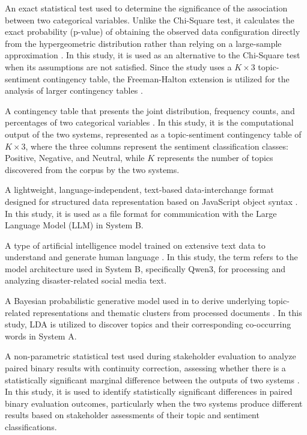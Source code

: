 \begin{description}[style=sameline,leftmargin=0pt]
	\item[Fisher's Exact Test.] An exact statistical test used to determine the significance of the association between two categorical variables. Unlike the Chi-Square test, it calculates the exact probability (p-value) of obtaining the observed data configuration directly from the hypergeometric distribution rather than relying on a large-sample approximation \parencite{mays2026use}. In this study, it is used as an alternative to the Chi-Square test when its assumptions are not satisfied. Since the study uses a \(K \times 3\) topic-sentiment contingency table, the Freeman-Halton extension is utilized for the analysis of larger contingency tables \parencite{metricgate2026freeman}.

	\item[Joint Matrix.] A contingency table that presents the joint distribution, frequency counts, and percentages of two categorical variables \parencite{ncssnd}. In this study, it is the computational output of the two systems, represented as a topic-sentiment contingency table of \(K \times 3\), where the three columns represent the sentiment classification classes: Positive, Negative, and Neutral, while \(K\) represents the number of topics discovered from the corpus by the two systems.

	\item[JSON (JavaScript Object Notation).] A lightweight, language-independent, text-based data-interchange format designed for structured data representation based on JavaScript object syntax \parencite{json2026introducing}. In this study, it is used as a file format for communication with the Large Language Model (LLM) in System B.

	\item[Large Language Model (LLM).] A type of artificial intelligence model trained on extensive text data to understand and generate human language \parencite{stryker2021large}. In this study, the term refers to the model architecture used in System B, specifically Qwen3, for processing and analyzing disaster-related social media text.

	\item[Latent Dirichlet Allocation (LDA).] A Bayesian probabilistic generative model used in \sysA{} to derive underlying topic-related representations and thematic clusters from processed documents \parencite{zang2026}. In this study, LDA is utilized to discover topics and their corresponding co-occurring words in System A.

	\item[McNemar's Test.] A non-parametric statistical test used during stakeholder evaluation to analyze paired binary results with continuity correction, assessing whether there is a statistically significant marginal difference between the outputs of two systems \parencite{mcp2025}. In this study, it is used to identify statistically significant differences in paired binary evaluation outcomes, particularly when the two systems produce different results based on stakeholder assessments of their topic and sentiment classifications.


\end{description}
